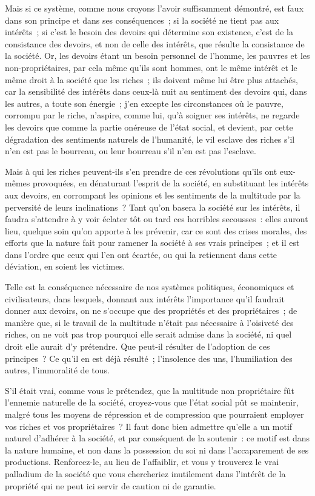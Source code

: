 \documentclass[french,twoside]{book} %
\begin{document}
Mais si ce système, comme nous croyons l’avoir suffisamment démontré, est faux dans son principe et dans ses conséquences ; si la société ne tient pas aux intérêts ; si c’est le besoin des devoirs qui détermine son existence, c’est de la consistance des devoirs, et non de celle des intérêts, que résulte la consistance de la société. Or, les devoirs étant un besoin personnel de l’homme, les pauvres et les non-propriétaires, par cela même qu’ils sont hommes, ont le même intérêt et le même droit à la société que les riches ; ils doivent même lui être plus attachés, car la sensibilité des intérêts dans ceux-là nuit au sentiment des devoirs qui, dans les autres, a toute son énergie ; j’en excepte les circonstances où le pauvre, corrompu par le riche, n’aspire, comme lui, qu’à soigner ses intérêts, ne regarde les devoirs que comme la partie onéreuse de l’état social, et devient, par cette dégradation des sentiments naturels de l’humanité, le vil esclave des riches s’il n’en est pas le bourreau, ou leur bourreau s’il n’en est pas l’esclave.\par
Mais à qui les riches peuvent-ils s’en prendre de ces révolutions qu’ils ont eux-mêmes provoquées, en dénaturant l’esprit de la société, en substituant les intérêts aux devoirs, en corrompant les opinions et les sentiments de la multitude par la perversité de leurs inclinations ? Tant qu’on basera la société sur les intérêts, il faudra s’attendre à y voir éclater tôt ou tard ces horribles secousses : elles auront lieu, quelque soin qu’on apporte à les prévenir, car ce sont des crises morales, des efforts que la nature fait pour ramener la société à ses vrais principes ; et il est dans l’ordre que ceux qui l’en ont écartée, ou qui la retiennent dans cette déviation, en soient les victimes.\par
Telle est la conséquence nécessaire de nos systèmes politiques, économiques et civilisateurs, dans lesquels, donnant aux intérêts l’importance qu’il faudrait donner aux devoirs, on ne s’occupe que des propriétés et des propriétaires ; de manière que, si le travail de la multitude n’était pas nécessaire à l’oisiveté des riches, on ne voit pas trop pourquoi elle serait admise dans la société, ni quel droit elle aurait d’y prétendre. Que peut-il résulter de l’adoption de ces principes ? Ce qu’il en est déjà résulté ; l’insolence des uns, l’humiliation des autres, l’immoralité de tous.\par
S’il était vrai, comme vous le prétendez, que la multitude non propriétaire fût l’ennemie naturelle de la société, croyez-vous que l’état social pût se maintenir, malgré tous les moyens de répression et de compression que pourraient employer vos riches et vos propriétaires ? Il faut donc bien admettre qu’elle a un motif naturel d’adhérer à la société, et par conséquent de la soutenir : ce motif est dans la nature humaine, et non dans la possession du soi ni dans l’accaparement de ses productions. Renforcez-le, au lieu de l’affaiblir, et vous y trouverez le vrai palladium de la société que vous chercheriez inutilement dans l’intérêt de la propriété qui ne peut ici servir de caution ni de garantie.\par
\end{document}

